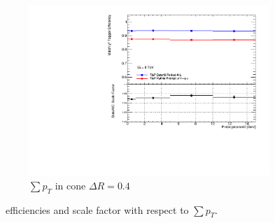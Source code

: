 \begin{figure}[phtb]
    \begin{subfigure}[b]{0.55\textwidth}
      \includegraphics[width=\textwidth]{PartCalibration2012/Plots/SFPlots/ptcone40_smt.pdf}
      \caption{$\sum p_{T}$ in cone $\Delta R=0.4$} \label{fig:CalibrationIsoPtcone40}
    \end{subfigure}
  \caption{\xsd\ efficiencies and scale factor with respect to $\sum p_{T}$.} \label{fig:CalibrationIsoPtcone}
\end{figure}

